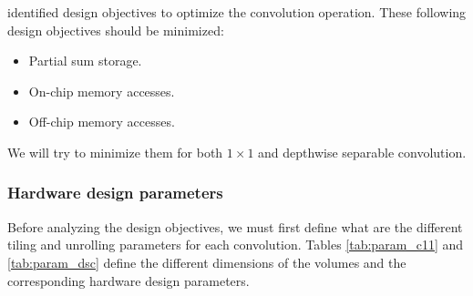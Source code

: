 \textcite{ma_optimizing_2018} identified design objectives to optimize the convolution operation. These following design objectives should be minimized:
%
\begin{itemize}
    \item Partial sum storage.
    \item On-chip memory accesses.
    \item Off-chip memory accesses.
\end{itemize}
%
We will try to minimize them for both $1 \times 1$ and depthwise separable convolution.
%
\subsubsection{Hardware design parameters}
%
Before analyzing the design objectives, we must first define what are the different tiling and unrolling parameters for each convolution. Tables \ref{tab:param_c11} and \ref{tab:param_dsc} define the different dimensions of the volumes and the corresponding hardware design parameters.

